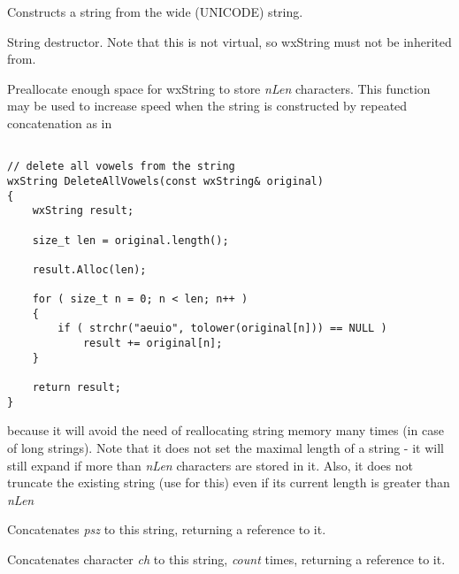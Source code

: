 
Constructs a string from the wide (UNICODE) string.

\label{wxstringdestruct}


String destructor. Note that this is not virtual, so wxString must not be inherited from.

\label{wxstringalloc}


Preallocate enough space for wxString to store {\it nLen} characters. This function
may be used to increase speed when the string is constructed by repeated
concatenation as in

\begin{verbatim}

// delete all vowels from the string
wxString DeleteAllVowels(const wxString& original)
{
    wxString result;

    size_t len = original.length();

    result.Alloc(len);

    for ( size_t n = 0; n < len; n++ )
    {
        if ( strchr("aeuio", tolower(original[n])) == NULL )
            result += original[n];
    }

    return result;
}

\end{verbatim}

because it will avoid the need of reallocating string memory many times (in case
of long strings). Note that it does not set the maximal length of a string - it
will still expand if more than {\it nLen} characters are stored in it. Also, it
does not truncate the existing string (use 
 for this) even if its current length is
greater than {\it nLen}

\label{wxstringappend}


Concatenates {\it psz} to this string, returning a reference to it.


Concatenates character {\it ch} to this string, {\it count} times, returning a reference
to it.

